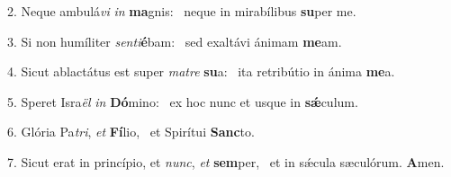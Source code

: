 2. Neque ambulá\textit{vi} \textit{in} \textbf{ma}gnis: \ast\  neque in mirabílibus \textbf{su}per me.\

3. Si non humíliter \textit{sen}\textit{ti}\textbf{é}bam: \ast\  sed exaltávi ánimam \textbf{me}am.\

4. Sicut ablactátus est super \textit{ma}\textit{tre} \textbf{su}a: \ast\  ita retribútio in ánima \textbf{me}a.\

5. Speret Isra\textit{ël} \textit{in} \textbf{Dó}mino: \ast\  ex hoc nunc et usque in \textbf{sǽ}culum.\

6. Glória Pa\textit{tri}, \textit{et} \textbf{Fí}lio, \ast\  et Spirítui \textbf{Sanc}to.\

7. Sicut erat in princípio, et \textit{nunc}, \textit{et} \textbf{sem}per, \ast\  et in sǽcula sæculórum. \textbf{A}men.\

